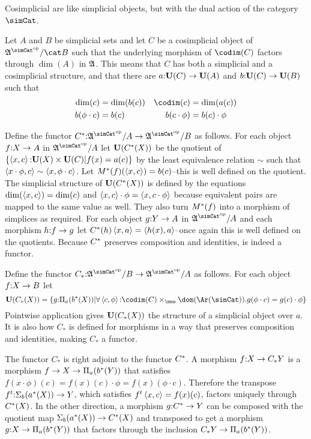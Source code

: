 \documentclass[csh.tex]{subfiles}
\begin{document}
Cosimplicial are like simplicial objects, but with the dual action of the category $\simCat$.

\begin{definition} Let $A$ and $B$ be simplicial sets and let $C$ be a cosimplicial object of $\ambient\s/\cat B$ such that the underlying morphism of $\codim(C)$ factors through $\dim(A)$ in $\mathfrak A$. This means that $C$ has both a simplicial and a cosimplicial structure, and that
there are $a\mathord :\mathbf{U}(C)\to\mathbf{U}(A)$ and $b\mathord :\mathbf{U}(C)\to\mathbf{U}(B)$ such that 
\begin{align*}
\dim(c) &= \dim(b(c)) & \codim(c) &= \dim(a(c))\\b(\phi\cdot c) &= b(c) & b(c\cdot\phi)&=b(c)\cdot\phi\\
\end{align*}

Define the functor $C\ri\of\ambient\s/A\to \ambient\s/B$ as follows. For each object $f\mathord : X\to A$ in $\ambient \s/A$ let $\mathbf{U}(C^*(X))$ be the quotient of $\left\{\left\langle x,c \right\rangle\mathord : \mathbf{U}(X)\times \mathbf{U}(C)| f(x)=a(c) \right\}$ by the least equivalence relation $\sim$ such that $\left\langle x\cdot\phi,c \right\rangle\sim\left\langle x,\phi\cdot c \right\rangle$. Let $M^*(f)(\left\langle x,c \right\rangle) = b(c)$--this is well defined on the quotient. 
The simplicial structure of $\mathbf{U}(C^*(X))$ is defined by the equations $\dim(\left\langle x,c \right\rangle) = \dim(c)$ and $\left\langle x,c \right\rangle\cdot \phi = \left\langle x,c\cdot\phi \right\rangle$ because equivalent pairs are mapped to the same value as well. They also turn $M^*(f)$ into a morphism of simplices as required. For each object $g\mathord : Y\to A$ in $\ambient \s/A$ and each morphism $h\mathord : f\to g$ let $C^*(h)\left\langle x,a \right\rangle = \left\langle h(x),a \right\rangle$--once again this is well defined on the quotients. Because $C^*$ preserves composition and identities, is indeed a functor.

Define the functor $C_*\of\ambient\s/B\to \ambient\s/A$ as follows. For each object $f\mathord : X\to B$ let 
\[ \base(C_*(X)) = \set{g\of \dprod a(b\ri(X)) | \forall \tuplet{c,\phi}\of\codim(C)\times_\nno\dom(\Ar(\simCat)).g(\phi\cdot c)= g(c)\cdot \phi }\]
Pointwise application gives $\mathbf{U}(C_*(X))$ the structure of a simplicial object over $a$. It is also how $C_*$ is defined for morphisms in a way that preserves composition and identities, making $C_*$ a functor.

The functor $C_*$ is right adjoint to the functor $C^*$. 
A morphism $f\mathord : X\to C_*Y$ is a morphism $f\to X \to \Pi_{a}(b^*(Y))$ that satisfies $f(x\cdot\phi)(c) = f(x)(c)\cdot\phi = f(x)(\phi\cdot c)$. Therefore the transpose $f^t\mathord : \Sigma_{b}(a^*(X)) \to Y$, which satisfies $f^t\left\langle x,c \right\rangle = f(x)(c)$, factors uniquely through $C^*(X)$. In the other direction, a morphism $g\mathord : C^*\to Y$ can be composed with the quotient map $\Sigma_{b}(a^*(X)) \to C^*(X)$ and transposed to get a morphism $g\mathord : X \to \Pi_{a}(b^*(Y))$ that factors through the inclusion $C_*Y\to \Pi_{a}(b^*(Y))$. 
\end{definition}
\end{document}
